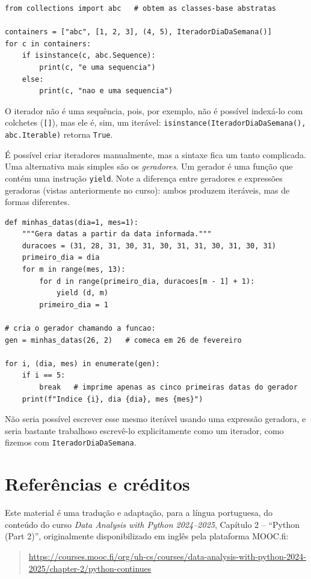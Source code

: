 \documentclass[11pt,a4paper]{article}
\begin{document}
\begin{lstlisting}
from collections import abc   # obtem as classes-base abstratas

containers = ["abc", [1, 2, 3], (4, 5), IteradorDiaDaSemana()]
for c in containers:
    if isinstance(c, abc.Sequence):
        print(c, "e uma sequencia")
    else:
        print(c, "nao e uma sequencia")
\end{lstlisting}

O iterador não é uma sequência, pois, por exemplo, não é possível indexá-lo
com colchetes (\texttt{[]}), mas ele é, sim, um iterável:
\texttt{isinstance(IteradorDiaDaSemana(), abc.Iterable)} retorna
\texttt{True}.

É possível criar iteradores manualmente, mas a sintaxe fica um tanto
complicada. Uma alternativa mais simples são os \emph{geradores}. Um
gerador é uma função que contém uma instrução \texttt{yield}. Note a
diferença entre geradores e expressões geradoras (vistas anteriormente no
curso): ambos produzem iteráveis, mas de formas diferentes.

\begin{lstlisting}
def minhas_datas(dia=1, mes=1):
    """Gera datas a partir da data informada."""
    duracoes = (31, 28, 31, 30, 31, 30, 31, 31, 30, 31, 30, 31)
    primeiro_dia = dia
    for m in range(mes, 13):
        for d in range(primeiro_dia, duracoes[m - 1] + 1):
            yield (d, m)
        primeiro_dia = 1

# cria o gerador chamando a funcao:
gen = minhas_datas(26, 2)   # comeca em 26 de fevereiro

for i, (dia, mes) in enumerate(gen):
    if i == 5:
        break   # imprime apenas as cinco primeiras datas do gerador
    print(f"Indice {i}, dia {dia}, mes {mes}")
\end{lstlisting}

Não seria possível escrever esse mesmo iterável usando uma expressão
geradora, e seria bastante trabalhoso escrevê-lo explicitamente como um
iterador, como fizemos com \texttt{IteradorDiaDaSemana}.

\section*{Referências e créditos}

Este material é uma tradução e adaptação, para a língua portuguesa, do
conteúdo do curso \emph{Data Analysis with Python 2024--2025}, Capítulo
2 -- ``Python (Part 2)'', originalmente disponibilizado em inglês pela
plataforma MOOC.fi:

\begin{quote}
\url{https://courses.mooc.fi/org/uh-cs/courses/data-analysis-with-python-2024-2025/chapter-2/python-continues}
\end{quote}
\end{document}
